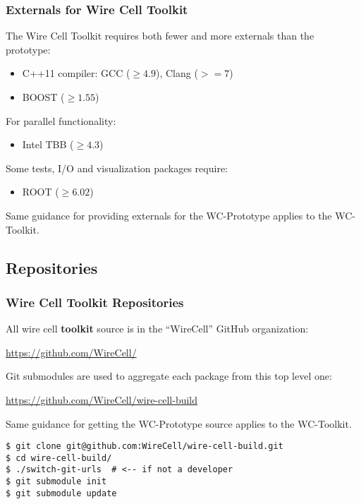 \documentclass[xcolor=dvipsnames]{beamer}
\begin{document}
\begin{frame}
  \frametitle{Externals for Wire Cell Toolkit}

  The Wire Cell Toolkit requires both fewer and more externals than the prototype:

  \begin{itemize}
  \item C++11 compiler: GCC ($\ge 4.9$), Clang ($>=7$)
  \item BOOST ($\ge 1.55$)
  \end{itemize}

  For parallel functionality:

  \begin{itemize}
  \item Intel TBB ($\ge 4.3$)
  \end{itemize}

  Some tests, I/O and visualization packages require:

  \begin{itemize}
  \item ROOT ($\ge 6.02$)
  \end{itemize}

  Same guidance for providing externals for the WC-Prototype applies to the WC-Toolkit.

\end{frame}


\subsection{Repositories}

\begin{frame}[fragile]
  \frametitle{Wire Cell Toolkit Repositories}

  All wire cell \textbf{toolkit} source is in the ``WireCell'' GitHub organization:

  \begin{center}
    \url{https://github.com/WireCell/}
  \end{center}

  Git submodules are used to aggregate each package from this top level one:

  \begin{center}
    \url{https://github.com/WireCell/wire-cell-build}
  \end{center}

  Same guidance for getting the WC-Prototype source applies to the WC-Toolkit.

\footnotesize
\begin{verbatim}
$ git clone git@github.com:WireCell/wire-cell-build.git
$ cd wire-cell-build/
$ ./switch-git-urls  # <-- if not a developer
$ git submodule init
$ git submodule update
\end{verbatim}

\end{frame}
\end{document}
